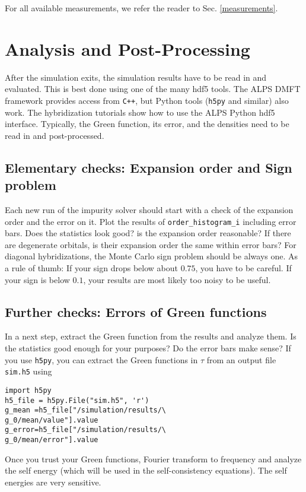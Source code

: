 \documentclass[aps,prb,floatfix,superscriptaddress,twocolumn,notitlepage]{revtex4-1}
\begin{document}
For all available measurements, we refer the reader to Sec. \ref{measurements}.

\section{Analysis and Post-Processing}
After the simulation exits, the simulation results have to be read in and evaluated. This is best done using one of the many hdf5 tools. The ALPS DMFT framework provides access from \verb#C++#, but Python
tools (\verb#h5py# and similar) also work. The hybridization tutorials show how to use the ALPS Python hdf5 interface. Typically, the Green function, its error, and the densities need to be read in and post-processed.


\subsection{Elementary checks: Expansion order and Sign problem}
Each new run of the impurity solver should start with a check of the expansion order and the error on it. Plot the results of \verb#order_histogram_i# including error bars. Does the statistics  look good? is the expansion order reasonable? If there are degenerate orbitals, is their expansion order the same within error bars?
For diagonal hybridizations, the Monte Carlo sign problem should be always one. As a rule of thumb: If your sign drops below about $0.75$, you have to be careful. If your sign is below $0.1$, your results are most likely too noisy to be useful.

\subsection{Further checks: Errors of Green functions}
In a next step, extract the Green function from the results and analyze them. Is the statistics good enough for your purposes? Do the error bars make sense? 
If you use \verb#h5py#, you can extract the Green functions in $\tau$ from an output file \verb#sim.h5# using
\begin{verbatim}
import h5py
h5_file = h5py.File("sim.h5", 'r')
g_mean =h5_file["/simulation/results/\
g_0/mean/value"].value
g_error=h5_file["/simulation/results/\
g_0/mean/error"].value
\end{verbatim}
Once you trust your Green functions, Fourier transform to frequency and analyze the self energy (which will be used in the self-consistency equations). The self energies are very sensitive.
\end{document}
